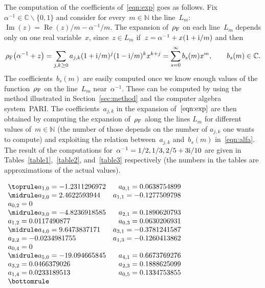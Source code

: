 \documentclass[pdftex]{sigma}
\newcommand{\N}{\mathbb{N}}
\newcommand{\C}{\mathbb{C}}
\numberwithin{equation}{section}
\begin{document}
The computation of the coefficients of~\eqref{eqn:exp} goes as follows.
Fix~$\alpha^{-1}\in\C\smallsetminus\{0,1\}$ and consider for every~$m\in\N$ the line~$L_m$: $\operatorname{Im}(z)=\operatorname{Re}(z)/m-\alpha^{-1}/m$. The expansion of~$\rho_{\rm F}$ on each line~$L_m$ depends only on one real variable~$x$, since~$z\in L_m$ if~$z=\alpha^{-1}+x(1+{\rm i}/m)$ and then
\begin{gather}\label{eqn:alfa}
\rho_{\rm F}\big(\alpha^{-1}+z\big)=\sum_{j,k\ge 0}{a_{j,k}}(1+{\rm i}/m)^j(1-{\rm i}/m)^kx^{k+j}=\sum_{s=0}^\infty{b_s(m)x^m} ,\qquad b_s(m)\in\C .
\end{gather}
The coefficients~$b_s(m)$ are easily computed once we know enough values of the function~$\rho_{\rm F}$ on the line~$L_m$ near~$\alpha^{-1}$. These can be computed by using the method illustrated in Section~\ref{sec:method} and the computer algebra system~PARI.
The coefficients~$a_{j,k}$ in the expansion of~$\eqref{eqn:exp}$ are then obtained by computing the expansion of~$\rho_{\rm F}$ along the lines $L_m$ for different values of~$m\in \N$ (the number of those depends on the number of $a_{j,k}$ one wants to compute) and exploiting the relation between~$a_{j,k}$ and~$b_s(m)$ in~\eqref{eqn:alfa}. The result of the computations for~$\alpha^{-1}=1/2,1/3,2/5+3{\rm i}/10$ are given in Tables~\ref{table1},~\ref{table2}, and~\ref{table3} respectively (the numbers in the tables are approximations of the actual values).
\begin{table}[h!]\centering
\caption[]{$\alpha^{-1}=1/2$, $\rho_{\rm F}=1$.}\label{table1}
$\begin{array}{lr}
\toprule
a_{1,0}=-1.2311296972& a_{0,1}=0.0638754899 \\
\midrule
a_{2,0}=2.4622593944& a_{1,1}=-0.1277509798\\
a_{0,2}=0 & \\
\midrule
a_{3,0}=-4.8236918585& a_{2,1}=0.1890620793\\
a_{1,2}=0.0117490877& a_{0,3}=0.0630206931\\
\midrule
a_{4,0}=9.6473837171&a_{3,1}=-0.3781241587\\
a_{2,2}=-0.0234981755&a_{1,3}=-0.1260413862\\
a_{0,4}=0 &\\
\midrule
a_{5,0}=-19.094665845& a_{4,1}=0.6673769276\\
a_{3,2}=0.0466379026& a_{2,3}=0.1888625099\\
a_{1,4}=0.0233189513& a_{0,5}=0.1334753855\\
\bottomrule
\end{array}$\vspace{-4mm}
\end{table}
\end{document}

